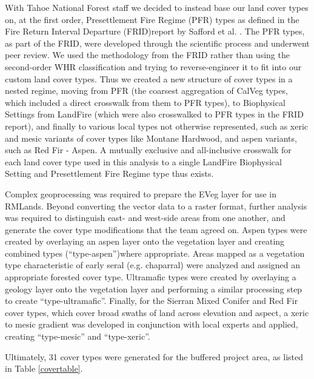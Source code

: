 With Tahoe National Forest staff we decided to instead base our land cover types on, at the first order, Presettlement Fire Regime (PFR) types as defined in the Fire Return Interval Departure (FRID)report by Safford et al. . The PFR types, as part of the FRID, were developed through the scientific process and underwent peer review. We used the methodology from the FRID rather than using the second-order WHR classification and trying to reverse-engineer it to fit into our custom land cover types. Thus we created a new structure of cover types in a nested regime, moving from PFR (the coarsest aggregation of CalVeg types, which included a direct crosswalk from them to PFR types), to Biophysical Settings from LandFire (which were also crosswalked to PFR types in the FRID report), and finally to various local types not otherwise represented, such as xeric and mesic variants of cover types like Montane Hardwood, and aspen variants, such as Red Fir - Aspen. A mutually exclusive and all-inclusive crosswalk for each land cover type used in this analysis to a single LandFire Biophysical Setting and Presettlement Fire Regime type thus exists.

Complex geoprocessing was required to prepare the EVeg layer for use in RMLands. Beyond converting the vector data to a raster format, further analysis was required to distinguish east- and west-side areas from one another, and generate the cover type modifications that the team agreed on. Aspen types were created by overlaying an aspen layer onto the vegetation layer and creating combined types (``type-aspen'')where appropriate. Areas mapped as a vegetation type characteristic of early seral (e.g. chaparral) were analyzed and assigned an appropriate forested cover type. Ultramafic types were created by overlaying a geology layer onto the vegetation layer and performing a similar processing step to create ``type-ultramafic''. Finally, for the Sierran Mixed Conifer and Red Fir cover types, which cover broad swaths of land across elevation and aspect, a xeric to mesic gradient was developed in conjunction with local experts and applied, creating ``type-mesic'' and ``type-xeric''.

Ultimately, 31 cover types were generated for the buffered project area, as listed in Table \ref{covertable}.

